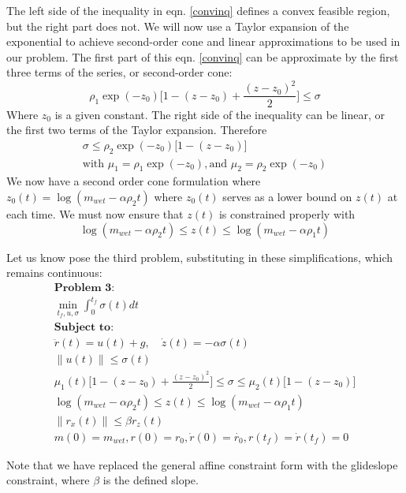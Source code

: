 \documentclass[journal]{new-aiaa}
\begin{document}
\begin{singlespace}
The left side of the inequality in eqn. \ref{convinq} defines a convex feasible region, but the right part does not. We will now use a Taylor expansion of the exponential to achieve second-order cone and linear approximations to be used in our problem. The first part of this eqn. \ref{convinq} can be approximate by the first three terms of the series, or second-order cone:
\begin{equation}
\rho_1 \exp(-z_0) \Big[ 1-(z-z_0)+\frac{(z-z_0)^2}{2} \Big] \leq \sigma
\end{equation}
Where $z_0$ is a given constant. The right side of the inequality can be linear, or the first two terms of the Taylor expansion. Therefore
\begin{align}
\sigma \leq \rho_2 \exp(-z_0) \big[ 1-(z-z_0)\big] \\
\text{with } \mu_1 = \rho_1 \exp(-z_0), \text{and } \mu_2 = \rho_2 \exp(-z_0)
\end{align}
We now have a second order cone formulation where $z_0(t) = \log(m_{wet}-\alpha\rho_2t)$ where $z_0(t)$ serves as a lower bound on $z(t)$ at each time. We must now ensure that $z(t)$ is constrained properly with
\begin{equation}
\log(m_{wet}-\alpha\rho_2t) \leq z(t) \leq \log(m_{wet}-\alpha\rho_1t) 
\end{equation}

Let us know pose the third problem, substituting in these simplifications, which remains continuous:
\begin{align*}
 \textbf{Problem 3:} \\
 \min_{t_f, u,\sigma}\int^{t_f}_0 \sigma(t) dt \\
 \textbf{Subject to:} \\
 \ddot{r}(t)= u(t) +g, \quad \dot{z}(t)=-\alpha \sigma(t) \\
 \|u(t)\| \leq \sigma(t) \\ 
 \mu_1(t)\Big[ 1-(z-z_0)+\frac{(z-z_0)^2}{2} \Big] \leq \sigma \leq \mu_2(t)\big[ 1-(z-z_0)\big] \\
 \log(m_{wet}-\alpha\rho_2t) \leq z(t) \leq \log(m_{wet}-\alpha\rho_1t) \\
 \|r_x(t)\| \leq \beta r_z(t) \\
 m(0) = m_{wet}, r(0) = r_0, \dot{r}(0) = \dot{r_0}, r(t_f) =\dot{r}(t_f) = 0
\end{align*}

Note that we have replaced the general affine constraint form with the glideslope constraint, where $\beta$ is the defined slope.
\clearpage


\end{singlespace}
\end{document}

